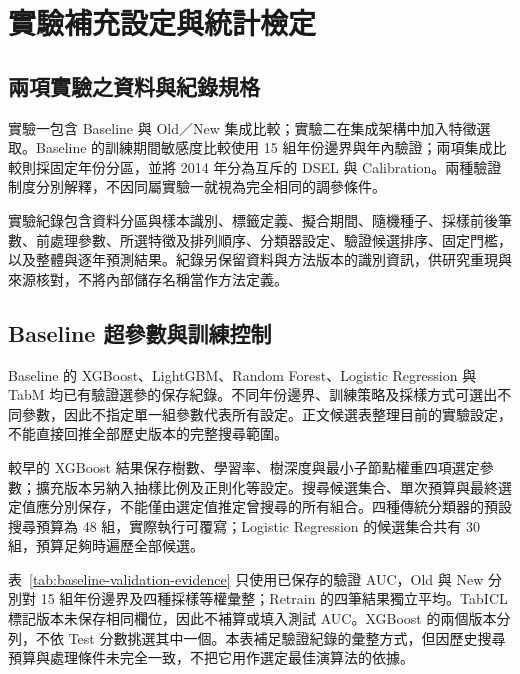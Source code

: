 \chapter{實驗補充設定與統計檢定}\label{app:experimental-details}
\begingroup
\renewcommand{\thesection}{\thechapter-\arabic{section}}
\setlength{\emergencystretch}{2em}

\section{兩項實驗之資料與紀錄規格}

實驗一包含 Baseline 與 Old／New 集成比較；實驗二在集成架構中加入特徵選取。Baseline 的訓練期間敏感度比較使用 15 組年份邊界與年內驗證；兩項集成比較則採固定年份分區，並將 2014 年分為互斥的 DSEL 與 Calibration。兩種驗證制度分別解釋，不因同屬實驗一就視為完全相同的調參條件。

實驗紀錄包含資料分區與樣本識別、標籤定義、擬合期間、隨機種子、採樣前後筆數、前處理參數、所選特徵及排列順序、分類器設定、驗證候選排序、固定門檻，以及整體與逐年預測結果。紀錄另保留資料與方法版本的識別資訊，供研究重現與來源核對，不將內部儲存名稱當作方法定義。

\section{Baseline 超參數與訓練控制}

Baseline 的 XGBoost、LightGBM、Random Forest、Logistic Regression 與 TabM 均已有驗證選參的保存紀錄。不同年份邊界、訓練策略及採樣方式可選出不同參數，因此不指定單一組參數代表所有設定。正文候選表整理目前的實驗設定，不能直接回推全部歷史版本的完整搜尋範圍。

較早的 XGBoost 結果保存樹數、學習率、樹深度與最小子節點權重四項選定參數；擴充版本另納入抽樣比例及正則化等設定。搜尋候選集合、單次預算與最終選定值應分別保存，不能僅由選定值推定曾搜尋的所有組合。四種傳統分類器的預設搜尋預算為 48 組，實際執行可覆寫；Logistic Regression 的候選集合共有 30 組，預算足夠時遍歷全部候選。

\clearpage


表~\ref{tab:baseline-validation-evidence} 只使用已保存的驗證 AUC，Old 與 New 分別對 15 組年份邊界及四種採樣等權彙整；Retrain 的四筆結果獨立平均。TabICL 標記版本未保存相同欄位，因此不補算或填入測試 AUC。XGBoost 的兩個版本分列，不依 Test 分數挑選其中一個。本表補足驗證紀錄的彙整方式，但因歷史搜尋預算與處理條件未完全一致，不把它用作選定最佳演算法的依據。

